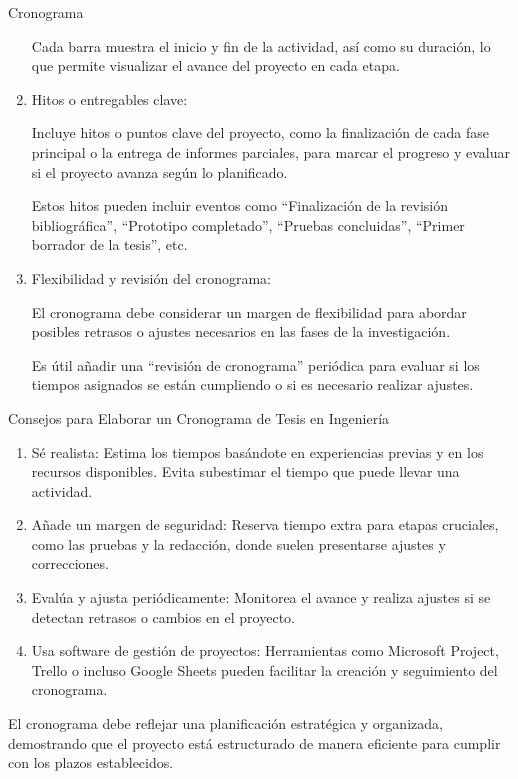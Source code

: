 \documentclass[9pt]{beamer}
\begin{document}
\begin{frame}{Cronograma}
\begin{enumerate}
    Cada barra muestra el inicio y fin de la actividad, así como su duración, lo que permite visualizar el avance del proyecto en cada etapa.

    \item Hitos o entregables clave:

    Incluye hitos o puntos clave del proyecto, como la finalización de cada fase principal o la entrega de informes parciales, para marcar el progreso y evaluar si el proyecto avanza según lo planificado.

    Estos hitos pueden incluir eventos como ``Finalización de la revisión bibliográfica'', ``Prototipo completado'', ``Pruebas concluidas'', ``Primer borrador de la tesis'', etc.

    \item Flexibilidad y revisión del cronograma:

    El cronograma debe considerar un margen de flexibilidad para abordar posibles retrasos o ajustes necesarios en las fases de la investigación.

    Es útil añadir una ``revisión de cronograma'' periódica para evaluar si los tiempos asignados se están cumpliendo o si es necesario realizar ajustes.
\end{enumerate}

Consejos para Elaborar un Cronograma de Tesis en Ingeniería

\begin{enumerate}
    \item Sé realista: Estima los tiempos basándote en experiencias previas y en los recursos disponibles. Evita subestimar el tiempo que puede llevar una actividad.
    \item Añade un margen de seguridad: Reserva tiempo extra para etapas cruciales, como las pruebas y la redacción, donde suelen presentarse ajustes y correcciones.
    \item Evalúa y ajusta periódicamente: Monitorea el avance y realiza ajustes si se detectan retrasos o cambios en el proyecto.
    \item Usa software de gestión de proyectos: Herramientas como Microsoft Project, Trello o incluso Google Sheets pueden facilitar la creación y seguimiento del cronograma.
\end{enumerate}

El cronograma debe reflejar una planificación estratégica y organizada, demostrando que el proyecto está estructurado de manera eficiente para cumplir con los plazos establecidos.
\end{frame}
\end{document}
